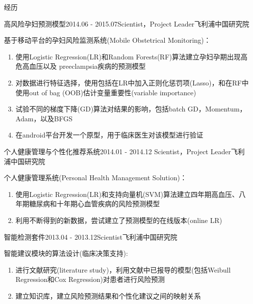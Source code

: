 \documentclass{resume} %
\begin{document}
\begin{rSection}{经历}
\begin{rSubsection}{高风险孕妇预测模型}{2014.06 - 2015.07}{Scientist，Project Leader}{飞利浦中国研究院}
\item 基于移动平台的孕妇风险监测系统(Mobile Obstetrical Monitoring)：
\begin{enumerate}
\item 使用Logistic Regression(LR)和Random Forests(RF)算法建立孕妇孕期出现高危高血压以及 preeclampsia疾病的预测模型
\item  对数据进行特征选择，使用包括在LR中加入正则化惩罚项(Lasso)，和在RF中使用out of bag (OOB)估计变量重要性(variable importance)
\item 试验不同的梯度下降(GD)算法对结果的影响，包括batch GD，Momentum，Adam，以及BFGS
\item 在android平台开发一个原型，用于临床医生对该模型进行验证
\end{enumerate}
\end{rSubsection}

\begin{rSubsection}{个人健康管理与个性化推荐系统}{2014.01 - 2014.12}{
		Scientist，Project Leader}{飞利浦中国研究院}
\item 个人健康管理系统(Personal Health Management Solution)：
\begin{enumerate}
\item 使用Logistic Regression(LR)和支持向量机(SVM)算法建立四年期高血压、八年期糖尿病和十年期心血管疾病的风险预测模型
\item 利用不断得到的新数据，尝试建立了预测模型的在线版本(online LR)
\end{enumerate}
\end{rSubsection}

\begin{rSubsection}{智能检测套件}{2013.04 - 2013.12}{Scientist}{飞利浦中国研究院}
\item 智能建议模块的算法设计(临床决策支持):
\begin{enumerate}
\item 进行文献研究(literature study)，利用文献中已报导的模型(包括Weibull Regression和Cox Regression)对患者进行风险预测
\item 建立知识库，建立风险预测结果和个性化建议之间的映射关系
\end{enumerate}
\end{rSubsection}


\end{rSection}
\end{document}
